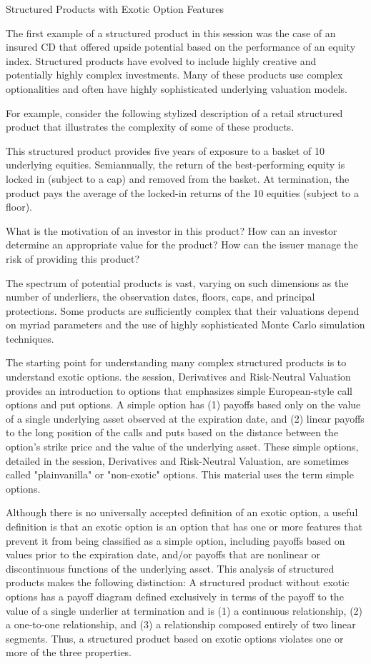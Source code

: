 \documentclass[11pt]{article}
\begin{document}
Structured Products with Exotic Option Features

The first example of a structured product in this session was the case of an insured CD that offered upside potential based on the performance of an equity index. Structured products have evolved to include highly creative and potentially highly complex investments. Many of these products use complex optionalities and often have highly sophisticated underlying valuation models.

For example, consider the following stylized description of a retail structured product that illustrates the complexity of some of these products.

This structured product provides five years of exposure to a basket of 10 underlying equities. Semiannually, the return of the best-performing equity is locked in (subject to a cap) and removed from the basket. At termination, the product pays the average of the locked-in returns of the 10 equities (subject to a floor).

What is the motivation of an investor in this product? How can an investor determine an appropriate value for the product? How can the issuer manage the risk of providing this product?

The spectrum of potential products is vast, varying on such dimensions as the number of underliers, the observation dates, floors, caps, and principal protections. Some products are sufficiently complex that their valuations depend on myriad parameters and the use of highly sophisticated Monte Carlo simulation techniques.

The starting point for understanding many complex structured products is to understand exotic options. the session, Derivatives and Risk-Neutral Valuation provides an introduction to options that emphasizes simple European-style call options and put options. A simple option has (1) payoffs based only on the value of a single underlying asset observed at the expiration date, and (2) linear payoffs to the long position of the calls and puts based on the distance between the option's strike price and the value of the underlying asset. These simple options, detailed in the session, Derivatives and Risk-Neutral Valuation, are sometimes called "plainvanilla" or "non-exotic" options. This material uses the term simple options.

Although there is no universally accepted definition of an exotic option, a useful definition is that an exotic option is an option that has one or more features that prevent it from being classified as a simple option, including payoffs based on values prior to the expiration date, and/or payoffs that are nonlinear or discontinuous functions of the underlying asset. This analysis of structured products makes the following distinction: A structured product without exotic options has a payoff diagram defined exclusively in terms of the payoff to the value of a single underlier at termination and is (1) a continuous relationship, (2) a one-to-one relationship, and (3) a relationship composed entirely of two linear segments. Thus, a structured product based on exotic options violates one or more of the three properties.
\end{document}
